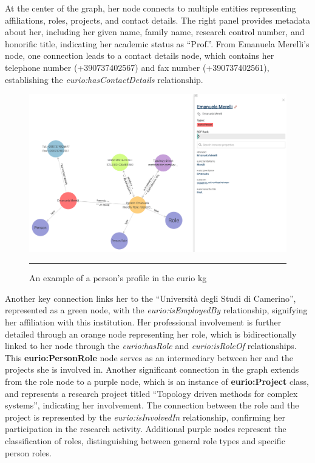 At the center of the graph, her node connects to multiple entities representing affiliations, roles, projects, and contact details.
The right panel provides metadata about her, including her given name, family name, research control number, and honorific title, indicating her academic status as ``Prof.''.
From Emanuela Merelli's node, one connection leads to a contact details node, which contains her telephone number (+390737402567) and fax number (+390737402561), establishing the \textit{eurio:hasContactDetails} relationship.

\begin{figure}[htbp]
    \centering
 \includegraphics[width=.9\textwidth]{figures/architecture/example-person-prof-merelli.png}
     \rule{35em}{0.5pt}
    \caption{An example of a person's profile in the \gls{eurio} \gls{kg}}
 \label{fig:example-person-prof-merelli}
\end{figure}

Another key connection links her to the ``Universit\`a degli Studi di Camerino'', represented as a green node, with the \textit{eurio:isEmployedBy} relationship, signifying her affiliation with this institution.
Her professional involvement is further detailed through an orange node representing her role, which is bidirectionally linked to her node through the \textit{eurio:hasRole} and \textit{eurio:isRoleOf} relationships.
This \textbf{eurio:PersonRole} node serves as an intermediary between her and the projects she is involved in.
Another significant connection in the graph extends from the role node to a purple node, which is an instance of \textbf{eurio:Project} class, and represents a research project titled ``Topology driven methods for complex systems'', indicating her involvement.
The connection between the role and the project is represented by the \textit{eurio:isInvolvedIn} relationship, confirming her participation in the research activity.
Additional purple nodes represent the classification of roles, distinguishing between general role types and specific person roles.


